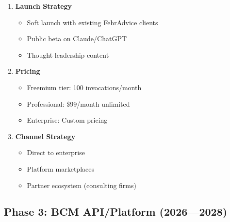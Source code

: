\begin{enumerate}
\item \textbf{Launch Strategy}
   \begin{itemize}
   \item Soft launch with existing FehrAdvice clients
   \item Public beta on Claude/ChatGPT
   \item Thought leadership content
   \end{itemize}

\item \textbf{Pricing}
   \begin{itemize}
   \item Freemium tier: 100 invocations/month
   \item Professional: \$99/month unlimited
   \item Enterprise: Custom pricing
   \end{itemize}

\item \textbf{Channel Strategy}
   \begin{itemize}
   \item Direct to enterprise
   \item Platform marketplaces
   \item Partner ecosystem (consulting firms)
   \end{itemize}
\end{enumerate}


\subsection{Phase 3: BCM API/Platform (2026---2028)}

